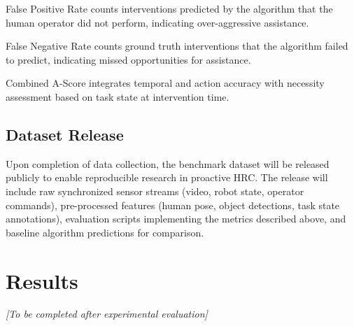 \documentclass[11pt, a4paper]{article}
\begin{document}
False Positive Rate counts interventions predicted by the algorithm that the human operator did not perform, indicating over-aggressive assistance.

False Negative Rate counts ground truth interventions that the algorithm failed to predict, indicating missed opportunities for assistance.

Combined A-Score integrates temporal and action accuracy with necessity assessment based on task state at intervention time.




\subsection{Dataset Release}

Upon completion of data collection, the benchmark dataset will be released publicly to enable reproducible research in proactive HRC. The release will include raw synchronized sensor streams (video, robot state, operator commands), pre-processed features (human pose, object detections, task state annotations), evaluation scripts implementing the metrics described above, and baseline algorithm predictions for comparison.

\section{Results}

\textit{[To be completed after experimental evaluation]}


\end{document}
